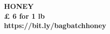 \documentclass[a5paper]{article}
\begin{document}
  \vspace*{\fill}
  \begin{center}
    {\fontsize{81pt}{20pt}\selectfont  \textbf{HONEY}}\\
    \vfill
    {\fontsize{55pt}{50pt}\selectfont  \textbf{£ 6 for 1 lb}}
    \\
    {\fontsize{21pt}{50pt}\selectfont  \textbf{https://bit.ly/bagbatchhoney}}
  \end{center}
  \vspace*{\fill}
\end{document}
